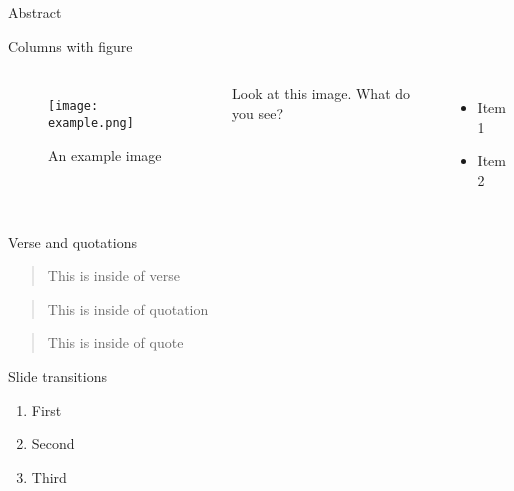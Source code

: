 \begin{frame}{Abstract}
  \begin{abstract}
    This is the abstract
  \end{abstract}
\end{frame}

\begin{frame}{Columns with figure}
  \begin{columns}
      \begin{figure}
        \texttt{[image: example.png]}
        \caption[my caption]{An example image}
      \end{figure}
      Look at this image. What do you see?
      \begin{itemize}
       \item Item 1
       \item Item 2
      \end{itemize}
  \end{columns}
\end{frame}


\begin{frame}{Verse and quotations}
  \begin{verse}
    This is inside of verse
  \end{verse}
  \begin{quotation}
    This is inside of quotation
  \end{quotation}
  \begin{quote}
    This is inside of quote
  \end{quote}
\end{frame}


\begin{frame}{Slide transitions}
  \begin{enumerate}
    \item<1,2> First
    \item<2> Second
    \item<3> Third
  \end{enumerate}
\end{frame}



